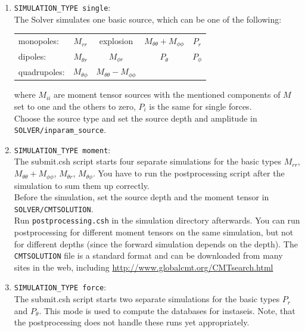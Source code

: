 \documentclass{article}
\begin{document}
\begin{enumerate}
\item \verb|SIMULATION_TYPE single|:\\ The Solver simulates one basic source, which can be
      one of the following:\\
      \begin{center}
        \begin{tabular}{|l|cccc|} \hline
         monopoles:   & $M_{rr}$ & explosion  & $M_{\theta\theta}+M_{\phi\phi}$  & $P_r$ \\
         dipoles:     & $M_{\theta r}$ & $M_{\phi r}$        & $P_{\theta}$ & $P_{\phi}$\\
         quadrupoles: & $M_{\theta \phi}$ & $M_{\theta\theta}-M_{\phi\phi}$ & & \\\hline
        \end{tabular}
      \end{center}
      where $M_{ii}$ are moment tensor sources with the mentioned components of $M$ set to
      one and the others to zero, $P_i$ is the same for single forces.\\ Choose the source
      type and set the source depth and amplitude in \verb|SOLVER/inparam_source|.

\item \verb|SIMULATION_TYPE moment|:\\
      The submit.csh script starts four separate simulations for the basic types $M_{rr}$,
      $M_{\theta\theta}+M_{\phi\phi}$, $M_{\theta r}$, $M_{\theta \phi}$. You have to run
      the postprocessing script after the simulation to sum them up correctly. \\ Before
      the simulation, set the source depth and the moment tensor in
      \verb|SOLVER/CMTSOLUTION|. \\Run \verb|postprocessing.csh| in the simulation
      directory afterwards. You can run postprocessing for different moment tensors on the
      same simulation, but not for different depths (since the forward simulation depends
      on the depth).  The \verb|CMTSOLUTION| file is a standard format and can be
      downloaded from many sites in the web, including
      \url{http://www.globalcmt.org/CMTsearch.html}

\item \verb|SIMULATION_TYPE force|:\\
      The submit.csh script starts two separate simulations for the basic types $P_r$ and
      $P_\theta$. This mode is used to compute the databases for instaseis. Note, that the
      postprocessing does not handle these runs yet appropriately.
\end{enumerate}
\end{document}
